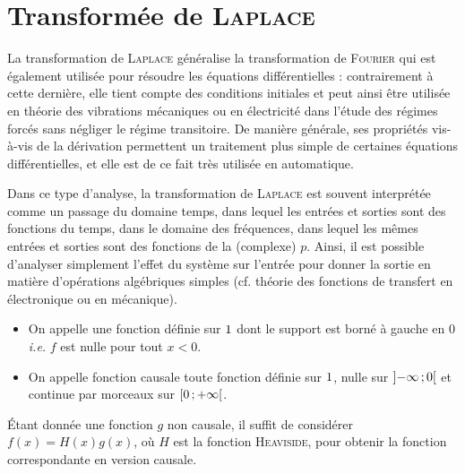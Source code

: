 \section{Transformée de \textsc{Laplace}} 
\label{transformee_laplace}


La transformation de \textsc{Laplace} généralise la transformation de \textsc{Fourier} qui est également utilisée pour résoudre les équations différentielles : contrairement à cette dernière, elle tient compte des conditions initiales et peut ainsi être utilisée en théorie des vibrations mécaniques ou en électricité dans l'étude des régimes forcés sans négliger le régime transitoire. De manière générale, ses propriétés vis-à-vis de la dérivation permettent un traitement plus simple de certaines équations différentielles, et elle est de ce fait très utilisée en automatique.

Dans ce type d'analyse, la transformation de \textsc{Laplace} est souvent interprétée comme un passage du domaine temps, dans lequel les entrées et sorties sont des fonctions du temps, dans le domaine des fréquences, dans lequel les mêmes entrées et sorties sont des fonctions de la  (complexe) $p$. Ainsi, il est possible d'analyser simplement l'effet du système sur l'entrée pour donner la sortie en matière d'opérations algébriques simples (cf. théorie des fonctions de transfert en électronique ou en mécanique). 

\begin{defi}
\begin{itemize}
    \item On appelle  une fonction définie sur $1$ dont le support est borné à gauche en $0$ \emph{i.e.} $f$ est nulle pour tout $x < 0$. 
    \item On appelle fonction causale toute fonction définie sur $1$, nulle sur $\left]-\infty\,;0\right[$ et continue par morceaux sur $\left[0\,;+\infty\right[$.
\end{itemize}
\end{defi}

\begin{remarque}
    Étant donnée une fonction $g$ non causale, il suffit de considérer $f(x) = H(x) g(x)$, où $H$ est la fonction \textsc{Heaviside}, pour obtenir la fonction correspondante en version causale.
\end{remarque}

